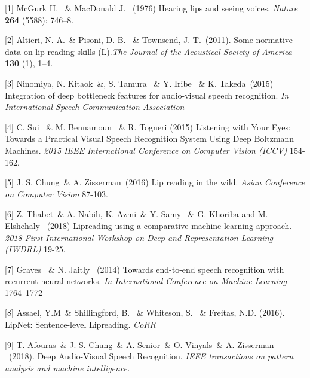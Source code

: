 \documentclass{article}
\begin{document}
[1] McGurk H. \ \& MacDonald J. \ (1976) Hearing lips and seeing voices. {\it Nature} {\bf 264} (5588): 746–8.

[2] Altieri, N. A.\ \& Pisoni, D. B. \ \& Townsend, J. T.\  (2011). Some normative data on lip-reading skills (L).{\it The Journal of the Acoustical Society of America}  {\bf 130} (1), 1–4.

[3]  Ninomiya, N. Kitaok\ \&, S. Tamura \ \& Y. Iribe \ \&  K. Takeda\ (2015) Integration of deep bottleneck features for audio-visual speech recognition. {\it In International Speech Communication Association}

[4] C. Sui \ \& M. Bennamoun \ \& R. Togneri (2015) Listening with Your Eyes: Towards a Practical Visual Speech Recognition System Using Deep Boltzmann Machines. {\it 2015 IEEE International Conference on Computer Vision (ICCV)} 154-162.

[5] J. S. Chung\ \& A. Zisserman\ (2016) Lip reading in the wild. {\it Asian Conference on Computer Vision} 87-103.

[6] Z. Thabet\ \& A. Nabih, K. Azmi\ \& Y. Samy \ \& G. Khoriba and M. Elshehaly \ (2018) Lipreading using a comparative machine learning approach. {\it 2018 First International Workshop on Deep and Representation Learning (IWDRL)} 19-25.

[7]  Graves \ \& N. Jaitly \ (2014) Towards end-to-end speech recognition with recurrent neural networks. {\it In International Conference on Machine Learning} 1764–1772

[8] Assael, Y.M\ \& Shillingford, B. \ \& Whiteson, S. \ \& Freitas, N.D. (2016). LipNet: Sentence-level Lipreading. {\it CoRR}

[9] T. Afouras\ \& J. S. Chung\ \& A. Senior\ \& O. Vinyals\ \& A. Zisserman \ (2018). Deep Audio-Visual Speech Recognition. {\it IEEE transactions on pattern analysis and machine intelligence.}
\end{document}
